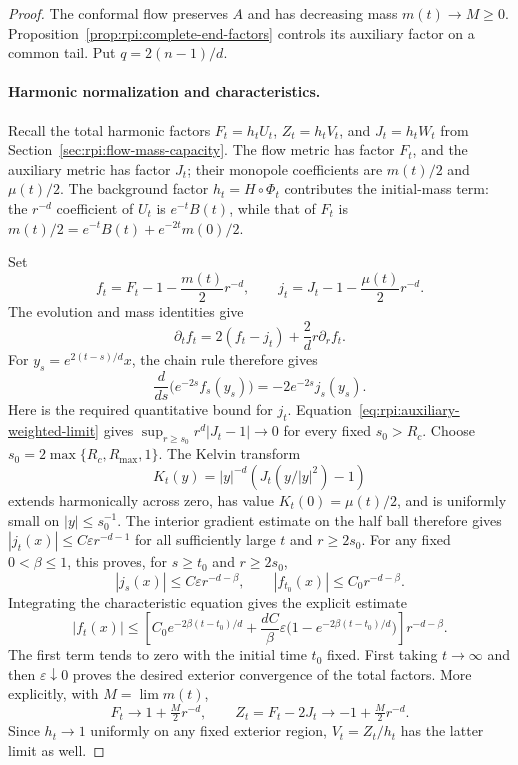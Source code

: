 \begin{proof}
The conformal flow preserves $A$ and has decreasing mass
$m(t)\to M\ge0$. Proposition~\ref{prop:rpi:complete-end-factors}
controls its auxiliary factor on a common tail. Put
$q=2(n-1)/d$.

\paragraph{Harmonic normalization and characteristics.}
Recall the total harmonic factors $F_t=h_tU_t$, $Z_t=h_tV_t$,
and $J_t=h_tW_t$ from Section~\ref{sec:rpi:flow-mass-capacity}.
The flow metric has factor $F_t$, and the auxiliary metric has factor
$J_t$; their monopole coefficients are $m(t)/2$ and $\mu(t)/2$.
The background factor $h_t=H\circ\Phi_t$ contributes the initial-mass
term: the $r^{-d}$ coefficient of $U_t$ is $e^{-t}B(t)$, while that
of $F_t$ is $m(t)/2=e^{-t}B(t)+e^{-2t}m(0)/2$.

Set
\[
 f_t=F_t-1-\frac{m(t)}2r^{-d},\qquad
 j_t=J_t-1-\frac{\mu(t)}2r^{-d}.
\]
The evolution and mass identities give
\[
 \partial_t f_t=2(f_t-j_t)+\frac2d r\partial_r f_t.
\]
For $y_s=e^{2(t-s)/d}x$, the chain rule therefore gives
\[
 \frac{d}{ds}\bigl(e^{-2s}f_s(y_s)\bigr)
 =-2e^{-2s}j_s(y_s).
\]
Here is the required quantitative bound for $j_t$.
Equation~\eqref{eq:rpi:auxiliary-weighted-limit} gives
$\sup_{r\ge s_0}r^d|J_t-1|\to0$ for every fixed
$s_0>R_c$. Choose $s_0=2\max\{R_c,R_{\max},1\}$.
The Kelvin transform
\[
 K_t(y)=|y|^{-d}(J_t(y/|y|^2)-1)
\]
extends harmonically across zero, has value
$K_t(0)=\mu(t)/2$, and is uniformly small on
$|y|\le s_0^{-1}$. The interior gradient estimate on the half ball
therefore gives $|j_t(x)|\le C\varepsilon r^{-d-1}$ for all sufficiently
large $t$ and $r\ge2s_0$. For any fixed $0<\beta\le1$, this proves,
for $s\ge t_0$ and $r\ge2s_0$,
\[
 |j_s(x)|\leq C\varepsilon r^{-d-\beta},\qquad
 |f_{t_0}(x)|\leq C_0r^{-d-\beta}.
\]
Integrating the characteristic equation gives the explicit estimate
\[
 |f_t(x)|\leq
 \left[C_0e^{-2\beta(t-t_0)/d}
 +\frac{dC}{\beta}\varepsilon
    \bigl(1-e^{-2\beta(t-t_0)/d}\bigr)\right]r^{-d-\beta}.
\]
The first term tends to zero with the initial time $t_0$ fixed. First taking $t\to\infty$ and
then $\varepsilon\downarrow0$ proves the desired exterior convergence
of the total factors. More explicitly, with $M=\lim m(t)$,
\[
 F_t\longrightarrow1+\tfrac M2r^{-d},\qquad
 Z_t=F_t-2J_t\longrightarrow-1+\tfrac M2r^{-d}.
\]
Since $h_t\to1$ uniformly on any fixed exterior region,
$V_t=Z_t/h_t$ has the latter limit as well.


\end{proof}
